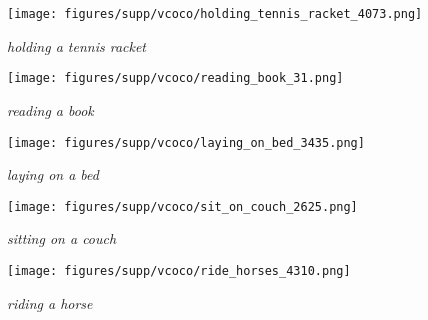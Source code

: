 \documentclass[10pt,twocolumn,letterpaper]{article}
\begin{document}
\begin{figure*}
\begin{subfigure}[t]{0.19\linewidth}
        \centering
        \texttt{[image: figures/supp/vcoco/holding\_tennis\_racket\_4073.png]}
        \caption{\textit{holding a tennis racket}}
        \label{fig:vcoco-holding-tennis-racket}
    \end{subfigure}
    \hfill \begin{subfigure}[t]{0.19\linewidth}
        \centering
        \texttt{[image: figures/supp/vcoco/reading\_book\_31.png]}
        \caption{\textit{reading a book}}
        \label{fig:vcoco-reading-book}
    \end{subfigure}
    \begin{subfigure}[t]{0.19\linewidth}
        \centering
        \texttt{[image: figures/supp/vcoco/laying\_on\_bed\_3435.png]}
        \caption{\textit{laying on a bed}}
        \label{fig:vcoco-laying-bed}
    \end{subfigure}
    \hfill \begin{subfigure}[t]{0.19\linewidth}
        \centering
        \texttt{[image: figures/supp/vcoco/sit\_on\_couch\_2625.png]}
        \caption{\textit{sitting on a couch}}
        \label{fig:vcoco-sitting-couch}
    \end{subfigure}
    \hfill \begin{subfigure}[t]{0.19\linewidth}
        \centering
        \texttt{[image: figures/supp/vcoco/ride\_horses\_4310.png]}
        \caption{\textit{riding a horse}}
        \label{fig:vcoco-riding-horse}
    \end{subfigure}


\end{figure*}
\end{document}
